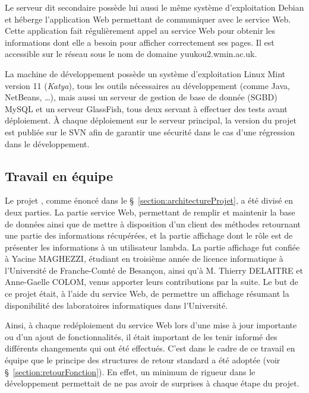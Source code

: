 Le serveur dit {\og}secondaire{\fg} poss\`ede lui aussi le m\^eme syst\`eme d'exploitation Debian et h\'eberge l'application Web permettant de communiquer avec le service Web.
Cette application fait r\'eguli\`erement appel au service Web pour obtenir les informations dont elle a besoin pour afficher correctement ses pages.
Il est accessible sur le r\'eseau sous le nom de domaine \textsf{yuukou2.wmin.ac.uk}.

La machine de d\'eveloppement poss\`ede un syst\`eme d'exploitation Linux Mint version 11 (\textit{Katya}), tous les outils n\'ecessaires au d\'eveloppement (comme Java, NetBeans, \ldots), mais aussi un serveur de gestion de base de donn\'ee (SGBD) MySQL et un serveur GlassFish, tous deux servant \`a effectuer des tests avant d\'eploiement.
\`A chaque d\'eploiement sur le serveur principal, la version du projet est publi\'ee sur le SVN afin de garantir une s\'ecurit\'e dans le cas d'une r\'egression dans le d\'eveloppement.

\subsection{Travail en \'equipe}
\label{section:travailequipe}

Le projet {\YuukouII}, comme \'enonc\'e dans le \S~\ref{section:architectureProjet}, a \'et\'e divis\'e en deux parties.
La partie service Web, permettant de remplir et maintenir la base de donn\'ees ainsi que de mettre \`a disposition d'un client des m\'ethodes retournant une partie des informations r\'ecup\'er\'ees, et la partie affichage dont le r\^ole est de pr\'esenter les informations \`a un utilisateur lambda.
La partie affichage fut confi\'ee \`a Yacine MAGHEZZI, \'etudiant en troisi\`eme ann\'ee de licence informatique \`a l'Universit\'e de Franche-Comt\'e de Besan\c{c}on, ainsi qu'\`a M. Thierry DELAITRE et Anne-Gaelle COLOM, venus apporter leurs contributions par la suite.
Le but de ce projet \'etait, \`a l'aide du service Web, de permettre un affichage r\'esumant la disponibilit\'e des laboratoires informatiques dans l'Universit\'e.

Ainsi, \`a chaque red\'eploiement du service Web lors d'une mise \`a jour importante ou d'un ajout de fonctionnalit\'es, il \'etait important de les tenir inform\'e des diff\'erents changements qui ont \'et\'e effectu\'es.
C'est dans le cadre de ce travail en \'equipe que le principe des structures de retour standard a \'et\'e adopt\'ee (voir \S~\ref{section:retourFonction}).
En effet, un minimum de rigueur dans le d\'eveloppement permettait de ne pas avoir de surprises \`a chaque \'etape du projet.

